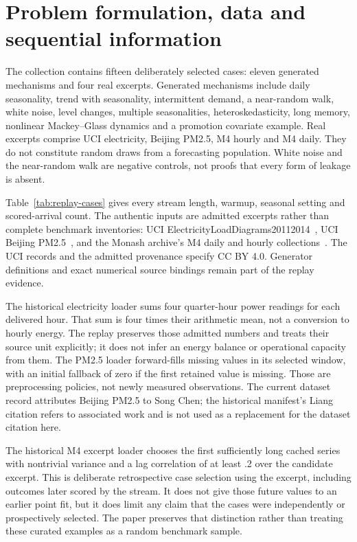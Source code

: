 \documentclass[11pt,a4paper]{article}
\begin{document}
\section{Problem formulation, data and sequential information}
The collection contains fifteen deliberately selected cases: eleven generated mechanisms and four real excerpts. Generated mechanisms include daily seasonality, trend with seasonality, intermittent demand, a near-random walk, white noise, level changes, multiple seasonalities, heteroskedasticity, long memory, nonlinear Mackey--Glass dynamics and a promotion covariate example. Real excerpts comprise UCI electricity, Beijing PM2.5, M4 hourly and M4 daily. They do not constitute random draws from a forecasting population. White noise and the near-random walk are negative controls, not proofs that every form of leakage is absent.

Table~\ref{tab:replay-cases} gives every stream length, warmup, seasonal setting and scored-arrival count. The authentic inputs are admitted excerpts rather than complete benchmark inventories: UCI ElectricityLoadDiagrams20112014~\cite{electricitydata}, UCI Beijing PM2.5~\cite{pmdata}, and the Monash archive's M4 daily and hourly collections~\cite{monashdata}. The UCI records and the admitted provenance specify CC BY 4.0. Generator definitions and exact numerical source bindings remain part of the replay evidence.



The historical electricity loader sums four quarter-hour power readings for each delivered hour. That sum is four times their arithmetic mean, not a conversion to hourly energy. The replay preserves those admitted numbers and treats their source unit explicitly; it does not infer an energy balance or operational capacity from them. The PM2.5 loader forward-fills missing values in its selected window, with an initial fallback of zero if the first retained value is missing. Those are preprocessing policies, not newly measured observations. The current dataset record attributes Beijing PM2.5 to Song Chen; the historical manifest's Liang citation refers to associated work and is not used as a replacement for the dataset citation here.

The historical M4 excerpt loader chooses the first sufficiently long cached series with nontrivial variance and a lag correlation of at least .2 over the candidate excerpt. This is deliberate retrospective case selection using the excerpt, including outcomes later scored by the stream. It does not give those future values to an earlier point fit, but it does limit any claim that the cases were independently or prospectively selected. The paper preserves that distinction rather than treating these curated examples as a random benchmark sample.
\end{document}
